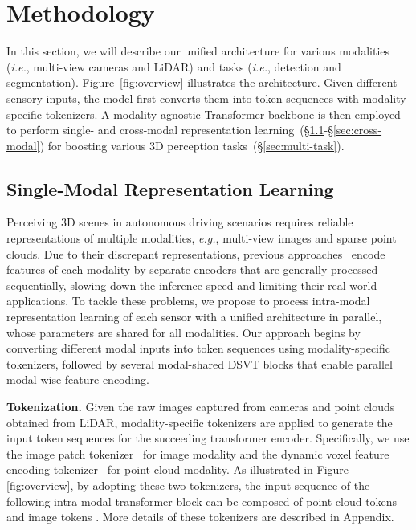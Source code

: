 \documentclass[10pt,twocolumn,letterpaper]{article}
\begin{document}
\section{Methodology}
In this section, we will describe our unified architecture for various modalities (\textit{i.e.}, multi-view cameras and LiDAR) and tasks (\textit{i.e.}, detection and segmentation). Figure~\ref{fig:overview} illustrates the architecture. Given different sensory inputs, the model first converts them into token sequences with modality-specific tokenizers. A modality-agnostic Transformer backbone is then employed to perform single- and cross-modal representation learning~(\S\ref{sec:single-modal}-\S\ref{sec:cross-modal}) for boosting various 3D perception tasks~(\S\ref{sec:multi-task}).
\subsection{Single-Modal Representation Learning} \label{sec:single-modal}
Perceiving 3D scenes in autonomous driving scenarios requires reliable representations of multiple modalities, \emph{e.g.}, multi-view images and sparse point clouds. Due to their discrepant representations, previous approaches~\cite{li2022unifying,chen2022futr3d,liu2022bevfusion,liang2022bevfusion} encode features of each modality by separate encoders that are generally processed sequentially, slowing down the inference speed and limiting their real-world applications. To tackle these problems, we propose to process intra-modal representation learning of each sensor with a unified architecture in parallel, whose parameters are shared for all modalities. Our approach begins by converting different modal inputs into token sequences using modality-specific tokenizers, followed by several modal-shared DSVT blocks that enable parallel modal-wise feature encoding. 

\noindent \textbf{Tokenization.} Given the raw images  captured from  cameras and point clouds  obtained from LiDAR, modality-specific tokenizers are applied to generate the input token sequences for the succeeding transformer encoder. Specifically, we use the image patch tokenizer~\cite{dosovitskiy2020image} for image modality and the dynamic voxel feature encoding tokenizer~\cite{zhou2020end} for point cloud modality. As illustrated in Figure \ref{fig:overview}, by adopting these two tokenizers, the input sequence  of the following intra-modal transformer block can be composed of  point cloud tokens  and  image tokens . More details of these tokenizers are described in Appendix. 
\end{document}
